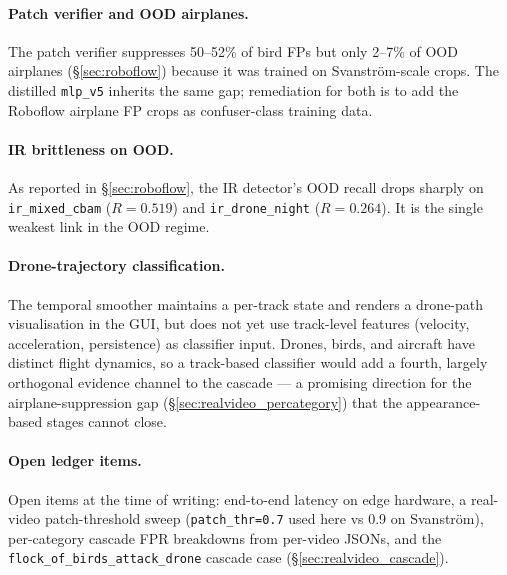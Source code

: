 \paragraph{Patch verifier and OOD airplanes.}
The patch verifier suppresses 50--52\% of bird FPs but only 2--7\% of OOD airplanes (\S\ref{sec:roboflow}) because it was trained on Svanstr\"om-scale crops. The distilled \texttt{mlp\_v5} inherits the same gap; remediation for both is to add the Roboflow airplane FP crops as confuser-class training data.

\paragraph{IR brittleness on OOD.}
As reported in \S\ref{sec:roboflow}, the IR detector's OOD recall drops sharply on \texttt{ir\_mixed\_cbam} ($R=0.519$) and \texttt{ir\_drone\_night} ($R=0.264$). It is the single weakest link in the OOD regime.

\paragraph{Drone-trajectory classification.}
The temporal smoother maintains a per-track state and renders a drone-path visualisation in the GUI, but does not yet use track-level features (velocity, acceleration, persistence) as classifier input. Drones, birds, and aircraft have distinct flight dynamics, so a track-based classifier would add a fourth, largely orthogonal evidence channel to the cascade --- a promising direction for the airplane-suppression gap (\S\ref{sec:realvideo_percategory}) that the appearance-based stages cannot close.

\paragraph{Open ledger items.}
Open items at the time of writing: end-to-end latency on edge hardware, a real-video patch-threshold sweep (\texttt{patch\_thr=0.7} used here vs 0.9 on Svanstr\"om), per-category cascade FPR breakdowns from per-video JSONs, and the \texttt{flock\_of\_birds\_attack\_drone} cascade case (\S\ref{sec:realvideo_cascade}).

